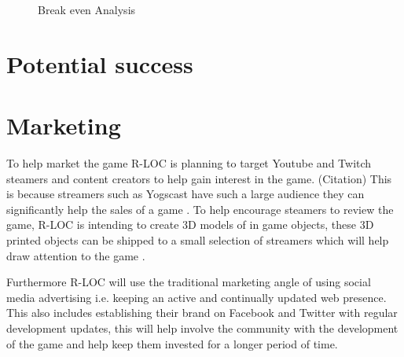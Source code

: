 \documentclass{scrartcl}
\begin{document}
\begin{landscape}
	\begin{figure}[h]
		\caption{Break even Analysis}
	\end{figure}
\end{landscape}

\section{Potential success}



\section{Marketing} %
To help market the game R-LOC is planning to target Youtube and Twitch steamers and content creators to help gain interest in the game. (Citation)
This is because streamers such as Yogscast have such a large audience they can significantly help the sales of a game \cite{Hoggins, Rose}.  To help encourage steamers to review the game, R-LOC is intending to create 3D models of in game objects, these 3D printed objects can be shipped to a small selection of streamers which will help draw attention to the game \cite{Rose}.

Furthermore R-LOC will use the traditional marketing angle of using social media advertising i.e. keeping an active and continually updated web presence. 
This also includes establishing their brand on Facebook and Twitter with regular development updates, this will help involve the community with the development of the game and help keep them invested for a longer period of time.
\end{document}
